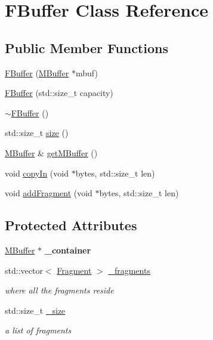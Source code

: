 \hypertarget{class_f_buffer}{}\section{F\+Buffer Class Reference}
\label{class_f_buffer}
\subsection*{Public Member Functions}
\begin{DoxyCompactItemize}
\item 
\hyperlink{class_f_buffer_a3aac6ae74811d7c6d3902ad5c1fdcab3}{F\+Buffer} (\hyperlink{struct_m_buffer}{M\+Buffer} $\ast$mbuf)
\item 
\hyperlink{class_f_buffer_a89680be41fb35ea1b9591ca646713f2f}{F\+Buffer} (std\+::size\+\_\+t capacity)
\item 
\hyperlink{class_f_buffer_a4e490d569edada34d24a5b16da72fafc}{$\sim$\+F\+Buffer} ()
\item 
std\+::size\+\_\+t \hyperlink{class_f_buffer_ae5f30d510287df8185bc30ecfd80840e}{size} ()
\item 
\hyperlink{struct_m_buffer}{M\+Buffer} \& \hyperlink{class_f_buffer_a0987483eef377d599dcae38a6aac5236}{get\+M\+Buffer} ()
\item 
void \hyperlink{class_f_buffer_a64064a784e0ada0957d76db6c83b22fa}{copy\+In} (void $\ast$bytes, std\+::size\+\_\+t len)
\item 
void \hyperlink{class_f_buffer_aee2d12df78293e2b3e8da359e7d0a757}{add\+Fragment} (void $\ast$bytes, std\+::size\+\_\+t len)
\end{DoxyCompactItemize}
\subsection*{Protected Attributes}
\begin{DoxyCompactItemize}
\item 
\mbox{\label{class_f_buffer_ac9dc209989dbda81840a3cfb96de77d5}} 
\hyperlink{struct_m_buffer}{M\+Buffer} $\ast$ {\bfseries \+\_\+container}
\item 
\mbox{\label{class_f_buffer_af444abbf2078dfd307692e9102a066ab}} 
std\+::vector$<$ \hyperlink{class_fragment}{Fragment} $>$ \hyperlink{class_f_buffer_af444abbf2078dfd307692e9102a066ab}{\+\_\+fragments}
\begin{DoxyCompactList}\small\item\em where all the fragments reside \end{DoxyCompactList}\item 
\mbox{\label{class_f_buffer_a5cf37f4378a3f5d778f65786a9fed276}} 
std\+::size\+\_\+t \hyperlink{class_f_buffer_a5cf37f4378a3f5d778f65786a9fed276}{\+\_\+size}
\begin{DoxyCompactList}\small\item\em a list of fragments \end{DoxyCompactList}\end{DoxyCompactItemize}
